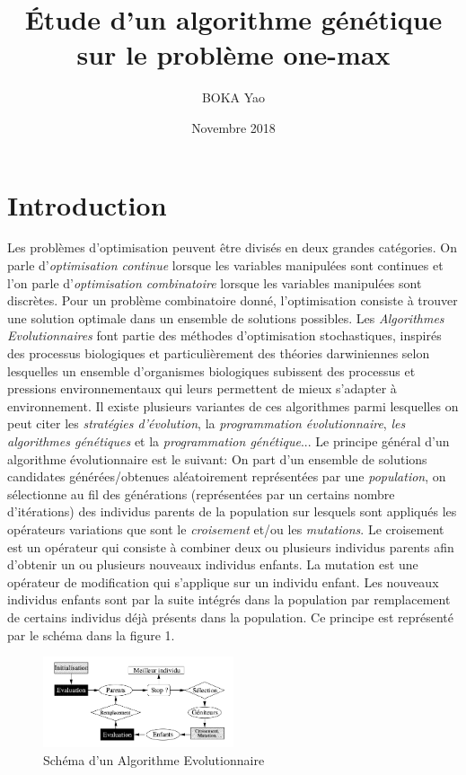 \documentclass[twocolumn]{article}
\title{Étude d'un algorithme génétique sur le problème one-max}
\author{BOKA Yao }
\date{Novembre 2018}
\begin{document}
\maketitle

\section{Introduction}

Les problèmes d'optimisation peuvent être divisés en deux grandes catégories. On parle d'\emph{optimisation continue} lorsque les variables manipulées sont continues et l'on parle d'\emph{optimisation combinatoire} lorsque les variables manipulées sont discrètes.
Pour un problème combinatoire donné, l'optimisation consiste à trouver une solution optimale dans un  ensemble de solutions possibles.  
Les \emph{Algorithmes Evolutionnaires} font partie des méthodes d'optimisation stochastiques, inspirés des processus biologiques et particulièrement des théories darwiniennes  selon lesquelles un ensemble d'organismes biologiques subissent des processus et pressions environnementaux qui leurs permettent de mieux s'adapter à environnement. Il existe plusieurs variantes de ces algorithmes parmi lesquelles on peut citer les \emph{stratégies d'évolution}, la \emph{programmation évolutionnaire}, \emph{les algorithmes génétiques} et la \emph{programmation génétique}...
Le principe général d'un algorithme évolutionnaire est le suivant: On part d'un ensemble de solutions candidates générées/obtenues aléatoirement représentées par une  \emph{population}, on sélectionne au fil des générations (représentées par un certains nombre d'itérations) des individus parents de la population sur lesquels sont appliqués les opérateurs variations que sont le \emph{croisement} et/ou les \emph{mutations}. Le croisement est un opérateur qui consiste à combiner deux ou plusieurs individus parents afin d'obtenir un ou plusieurs nouveaux individus enfants. La mutation est une opérateur de modification qui s'applique sur un individu enfant. Les nouveaux individus enfants sont par la suite intégrés dans la population par remplacement de certains individus déjà présents dans la population. Ce principe est représenté par le schéma dans la figure 1.

\begin{figure}[h]
    \centering
    \includegraphics[width=0.5\textwidth]{schema_EA}{\centering}
    \caption{Schéma d'un Algorithme Evolutionnaire}
    \label{fig:mesh1}
\end{figure}
\end{document}
